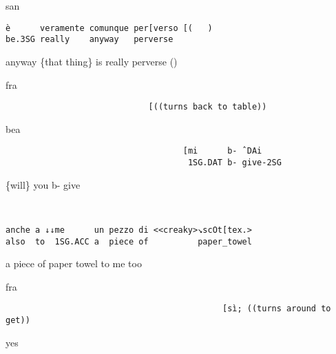 \documentclass[output=paper,modfonts]{langscibook}
\begin{document}
\vspace{2mm}
%
\vspace{-0.75mm}
%
\begin{transbox}{2}{san}
\begin{verbatim}
è      veramente comunque per[verso [(   )
be.3SG really    anyway   perverse
\end{verbatim}
anyway \{that thing\} is really perverse (\hspace{0.5cm})
\end{transbox}\vspace{1.5mm}
%
\begin{transbox}{3}{fra}
\begin{verbatim}
                             [((turns back to table))
\end{verbatim}
\end{transbox}\vspace{-0.5mm}
%
\begin{mdframednoverticalspace}[style=firstfoc]
\begin{transbox}{4}{bea}
\begin{verbatim}
                                    [mi      b- ˆDAi
                                     1SG.DAT b- give-2SG
\end{verbatim}
\hspace{5.4cm} \{will\} you b- give
\end{transbox}
\end{mdframednoverticalspace}\vspace{1.5mm}
%
\begin{transbox}{5}{~}
\begin{verbatim}
anche a ↓↓me      un pezzo di <<creaky>↘scOt[tex.>
also  to  1SG.ACC a  piece of          paper_towel  
\end{verbatim}
a piece of paper towel to me too
\end{transbox}\vspace{0.25mm}
%
\begin{mdframednoverticalspace}[style=secondfoc]
\begin{transbox}{6}{fra}
\begin{verbatim}
                                            [sì; ((turns around to get))
\end{verbatim}
\hspace{6.65cm} yes
\end{transbox}
\end{mdframednoverticalspace}\vspace{1mm}
\end{document}
